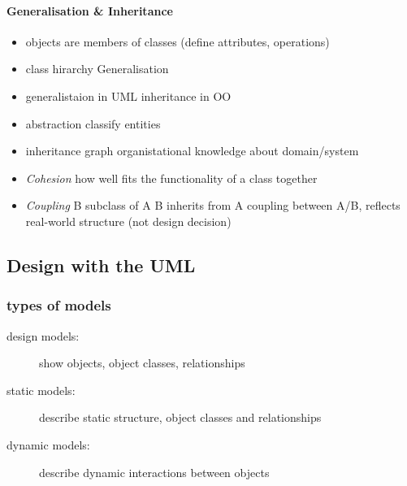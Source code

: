 \documentclass[a4paper, 10pt]{article}
\begin{document}
\paragraph*{Generalisation \& Inheritance}
\begin{itemize}
	\item objects are members of classes (define attributes, operations)
	\item class hirarchy \follows Generalisation
	\item generalistaion in UML \follows inheritance in OO
	\item abstraction \follows classify entities
	\item inheritance graph \follows organistational knowledge about domain/system
	\item \emph{Cohesion} how well fits the functionality of a class together
	\item \emph{Coupling} B subclass of A \follows B inherits from A \follows coupling between A/B, reflects real-world structure (not design decision)
\end{itemize}

\subsection*{Design with the UML}
\subsubsection*{types of models}
\begin{description}
	\item[design models:] show objects, object classes, relationships
	\item[static models:] describe static structure, object classes and relationships
	\item[dynamic models:] describe dynamic interactions between objects
\end{description}
\end{document}
